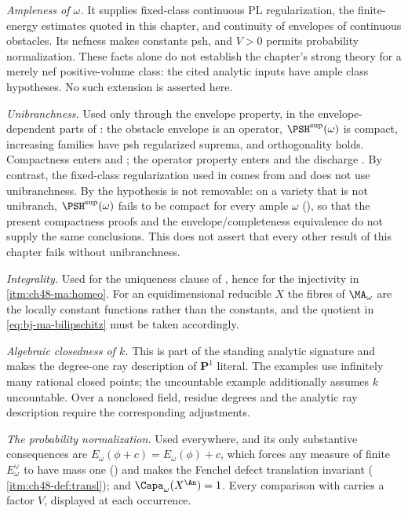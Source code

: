 \emph{Ampleness of $\omega$.} It supplies fixed-class continuous PL
regularization, the finite-energy estimates quoted in this chapter,
and continuity of envelopes of continuous obstacles. Its nefness
makes constants psh, and $V>0$ permits probability normalization.
These facts alone do not establish the chapter's strong theory for a
merely nef positive-volume class: the cited analytic inputs have ample
class hypotheses. No such extension is asserted here.

\emph{Unibranchness.}  Used only through the envelope property, in the
envelope-dependent parts of : the obstacle envelope
is an operator, $\PSH^{\sup}(\omega)$ is compact, increasing families
have psh regularized suprema, and orthogonality holds.  Compactness enters
 and
; the operator property enters
 and the discharge
.  By contrast, the fixed-class regularization
used in  comes from
 and does not use unibranchness.  By
 the hypothesis is not
removable: on a variety that is not unibranch,
$\PSH^{\sup}(\omega)$ fails to be compact for every ample $\omega$
(), so that the present compactness proofs and the envelope/completeness
equivalence do not supply the same conclusions. This does not assert
that every other result of this chapter fails without unibranchness.

\emph{Integrality.}  Used for the uniqueness clause of
, hence for the injectivity in
\,\cref{itm:ch48-ma:homeo}.  For an
equidimensional reducible $X$ the fibres of $\MA_\omega$ are the
locally constant functions rather than the constants, and the quotient in
\eqref{eq:bj-ma-bilipschitz} must be taken accordingly.

\emph{Algebraic closedness of $k$.} This is part of the standing
analytic signature and makes the degree-one ray description of
$\mathbf P^1$ literal. The examples use infinitely many rational
closed points; the uncountable example additionally assumes $k$
uncountable. Over a nonclosed field, residue degrees and the analytic
ray description require the corresponding adjustments.

\emph{The probability normalization.}  Used everywhere, and its only
substantive consequences are $E_\omega(\phi+c)=E_\omega(\phi)+c$, which
forces any measure of finite $E^\vee_\omega$ to have mass one
() and makes the Fenchel defect
translation invariant
(\,\cref{itm:ch48-def:transl}); and
$\Capa_\omega(X^{\An})=1$.  Every comparison with
 carries a factor
$V$, displayed at each occurrence.

